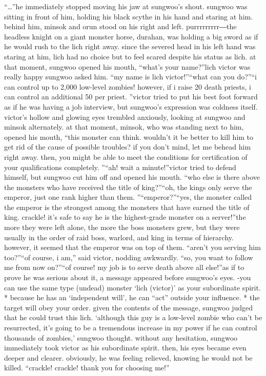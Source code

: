 “…”he immediately stopped moving his jaw at sungwoo’s shout.
 sungwoo was sitting in front of him, holding his black scythe in his hand and staring at him.
 behind him, minsok and orun stood on his right and left.
purrrrrrrrr―the headless knight on a giant monster horse, durahan, was holding a big sword as if he would rush to the lich right away.
 since the severed head in his left hand was staring at him, lich had no choice but to feel scared despite his status as lich.
at that moment, sungwoo opened his mouth, “what’s your name?”lich victor was really happy sungwoo asked him.
“my name is lich victor!”“what can you do?”“i can control up to 2,000 low-level zombies! however, if i raise 20 death priests, i can control an additional 50 per priest.
”victor tried to put his best foot forward as if he was having a job interview, but sungwoo’s expression was coldness itself.
victor’s hollow and glowing eyes trembled anxiously, looking at sungwoo and minsok alternately.
at that moment, minsok, who was standing next to him, opened his mouth, “this monster can think.
 wouldn’t it be better to kill him to get rid of the cause of possible troubles? if you don’t mind, let me behead him right away.
 then, you might be able to meet the conditions for certification of your qualifications completely.
”“ah! wait a minute!”victor tried to defend himself, but sungwoo cut him off and opened his mouth.
“who else is there above the monsters who have received the title of king?”“oh, the kings only serve the emperor, just one rank higher than them.
”“emperor?”“yes, the monster called the emperor is the strongest among the monsters that have earned the title of king.
 crackle! it’s safe to say he is the highest-grade monster on a server!”the more they were left alone, the more the boss monsters grew, but they were usually in the order of raid boss, warlord, and king in terms of hierarchy.
 however, it seemed that the emperor was on top of them.
“aren’t you serving him too?”“of course, i am,” said victor, nodding awkwardly.
“so, you want to follow me from now on?”“of course! my job is to serve death above all else!”as if to prove he was serious about it, a message appeared before sungwoo’s eyes.
-you can use the same type (undead) monster ‘lich (victor)’ as your subordinate spirit.
* because he has an ‘independent will’, he can “act” outside your influence.
* the target will obey your order.
given the contents of the message, sungwoo judged that he could trust this lich.
‘although this guy is a low-level zombie who can’t be resurrected, it’s going to be a tremendous increase in my power if he can control thousands of zombies,’ sungwoo thought.
without any hesitation, sungwoo immediately took victor as his subordinate spirit.
then, his eyes became even deeper and clearer.
 obviously, he was feeling relieved, knowing he would not be killed.
“crackle! crackle! thank you for choosing me!”

